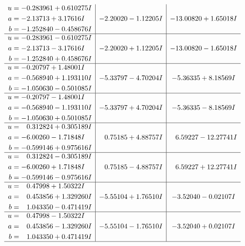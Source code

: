 \documentclass[1p]{elsarticle_modified}
\theoremstyle{definition}
\begin{document}
$$\begin{array}{c|c|c}
\begin{aligned}
u &= -0.283961 + 0.610275 I \\
a &= -2.13713 + 3.17616 I \\
b &= -1.252840 - 0.458676 I\end{aligned}
 & -2.20020 - 1.12205 I & -13.00820 + 1.65018 I \\ \hline\begin{aligned}
u &= -0.283961 - 0.610275 I \\
a &= -2.13713 - 3.17616 I \\
b &= -1.252840 + 0.458676 I\end{aligned}
 & -2.20020 + 1.12205 I & -13.00820 - 1.65018 I \\ \hline\begin{aligned}
u &= -0.20797 + 1.48001 I \\
a &= -0.568940 + 1.193110 I \\
b &= -1.050630 - 0.501085 I\end{aligned}
 & -5.33797 - 4.70204 I & -5.36335 + 8.18569 I \\ \hline\begin{aligned}
u &= -0.20797 - 1.48001 I \\
a &= -0.568940 - 1.193110 I \\
b &= -1.050630 + 0.501085 I\end{aligned}
 & -5.33797 + 4.70204 I & -5.36335 - 8.18569 I \\ \hline\begin{aligned}
u &= \phantom{-}0.312824 + 0.305189 I \\
a &= -6.00260 - 1.71848 I \\
b &= -0.599146 + 0.975616 I\end{aligned}
 & \phantom{-}0.75185 + 4.88757 I & \phantom{-}6.59227 - 12.27741 I \\ \hline\begin{aligned}
u &= \phantom{-}0.312824 - 0.305189 I \\
a &= -6.00260 + 1.71848 I \\
b &= -0.599146 - 0.975616 I\end{aligned}
 & \phantom{-}0.75185 - 4.88757 I & \phantom{-}6.59227 + 12.27741 I \\ \hline\begin{aligned}
u &= \phantom{-}0.47998 + 1.50322 I \\
a &= \phantom{-}0.453856 + 1.329260 I \\
b &= \phantom{-}1.043350 - 0.471419 I\end{aligned}
 & -5.55104 + 1.76510 I & -3.52040 - 0.02107 I \\ \hline\begin{aligned}
u &= \phantom{-}0.47998 - 1.50322 I \\
a &= \phantom{-}0.453856 - 1.329260 I \\
b &= \phantom{-}1.043350 + 0.471419 I\end{aligned}
 & -5.55104 - 1.76510 I & -3.52040 + 0.02107 I\\
 \hline 
 \end{array}$$\newpage
\end{document}
